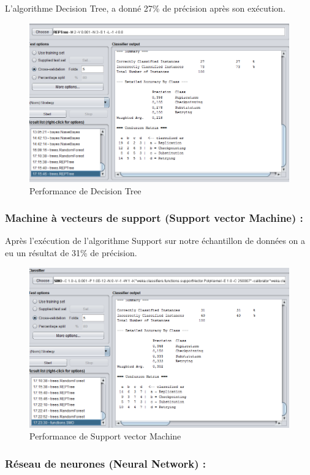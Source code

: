 L'algorithme Decision Tree, a donné 27\% de précision après son exécution.

\begin{figure}[H]
\begin{center}
\includegraphics[width=0.8\linewidth]{images/perfDecTree.PNG}
\end{center}
\caption{Performance de Decision Tree}
\label{fig:17}
\end{figure}


\subsubsection{Machine à vecteurs de support (Support vector Machine) :}

Après l'exécution de l'algorithme Support sur notre échantillon de données on a eu un résultat de 31\% de précision.

\begin{figure}[H]
\begin{center}
\includegraphics[width=0.8\linewidth]{images/perfSMO.PNG}
\end{center}
\caption{Performance de Support vector Machine }
\label{fig:18}
\end{figure}

\subsubsection{Réseau de neurones (Neural Network) :}

